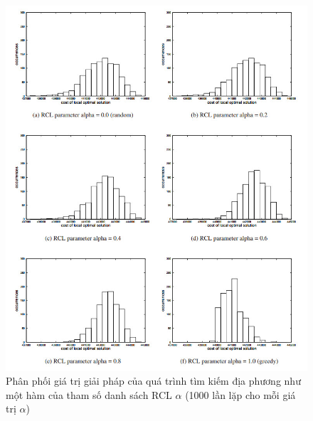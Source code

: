 \documentclass[14pt,a4paper]{report}
\begin{document}
\begin{center}
	\begin{figure}[htp]
		\begin{center}
			\includegraphics[scale=.75]{images/hinh1_7}
		\end{center}
		\caption{Phân phối giá trị giải pháp của quá trình tìm kiếm địa phương như một hàm của tham số danh sách RCL $\alpha$ (1000 lần lặp cho mỗi giá trị $\alpha$)}
		\label{refhinh2}
	\end{figure}
\end{center}
\end{document}

